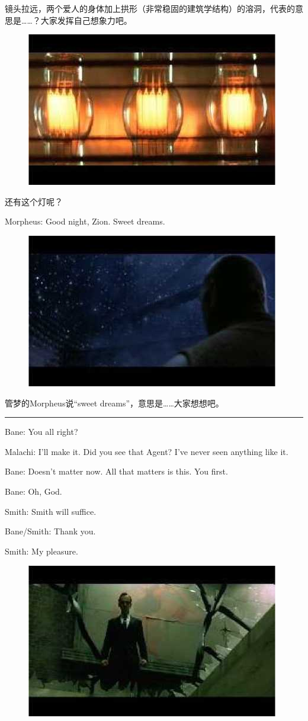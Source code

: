 \documentclass[UTF8]{ctexart}
\newcommand{\myparsep}{\noindent \rule[0.5ex]{\linewidth}{1pt}}
\newenvironment{myquote}{\color{green} \setlength{\leftskip}{6em} \setlength{\rightskip}{4em} \setlength{\parindent}{-2em}}{\par}
\begin{document}
镜头拉远，两个爱人的身体加上拱形（非常稳固的建筑学结构）的溶洞，代表的意思是……？大家发挥自己想象力吧。

\begin{figure}[htb]
\centering
\includegraphics[width=0.5\linewidth]{fig/read_reloaded-47}
\end{figure}

还有这个灯呢？

\begin{myquote}
Morpheus: Good night, Zion. Sweet dreams.
\end{myquote}

\begin{figure}[htb]
\centering
\includegraphics[width=0.5\linewidth]{fig/read_reloaded-48}
\end{figure}

管梦的Morpheus说“sweet dreams”，意思是……大家想想吧。

\myparsep

\begin{myquote}
Bane: You all right?

Malachi: I'll make it. Did you see that Agent? I've never seen anything like it.

Bane: Doesn't matter now. All that matters is this. You first.

Bane: Oh, God.

Smith: Smith will suffice.

Bane/Smith: Thank you.

Smith: My pleasure.
\end{myquote}

\begin{figure}[htb]
\centering
\includegraphics[width=0.5\linewidth]{fig/read_reloaded-49}
\end{figure}
\end{document}
